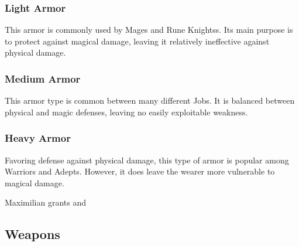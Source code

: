 \subsubsection{Light Armor}

This armor is commonly used by Mages and Rune Knightss. Its main purpose is to protect against magical damage, leaving it relatively ineffective against physical damage.

\begin{tabarm}[label=inv-larm]
    
\end{tabarm}

\clearpage
\subsubsection{Medium Armor}

This armor type is common between many different Jobs.  It is balanced between physical and magic defenses, leaving no easily exploitable weakness.

\begin{tabarm}[label=inv-marm]
    
\end{tabarm}

\clearpage
\subsubsection{Heavy Armor}

Favoring defense against physical damage, this type of armor is popular among Warriors and Adepts.  However, it does leave the wearer more vulnerable to magical damage.

\begin{tabarm}[label=inv-harm]
    
\end{tabarm}
{\footnotesize Maximilian grants  and }
\clearpage

\subsection{Weapons}\label{subsec:inv-weapons}

